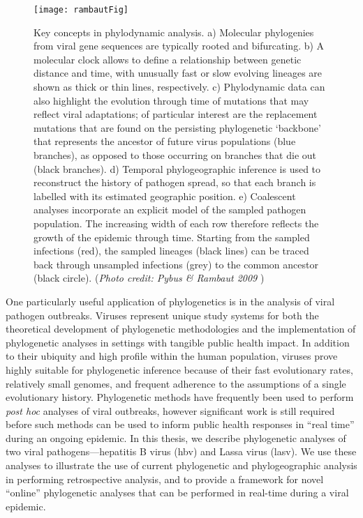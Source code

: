 \begin{figure}[ht]
  \centering
  \medskip
  \texttt{[image: rambautFig]}
  \caption[Applications of phylogenetic analysis]{Key concepts in phylodynamic analysis.
  a) Molecular phylogenies from viral gene sequences are typically rooted and bifurcating.
  b) A molecular clock allows to define a relationship between genetic distance and time, with unusually fast or slow evolving lineages are shown as thick or thin lines, respectively.
  c) Phylodynamic data can also highlight the evolution through time of mutations that may reflect viral adaptations; of particular interest are the replacement mutations that are found on the persisting phylogenetic ‘backbone’ that represents the ancestor of future virus populations (blue branches), as opposed to those occurring on branches that die out (black branches).
  d) Temporal phylogeographic inference is used to reconstruct the history of pathogen spread, so that each branch is labelled with its estimated geographic position.
  e) Coalescent analyses incorporate an explicit model of the sampled pathogen population.
  The increasing width of each row therefore reflects the growth of the epidemic through time. Starting from the sampled infections (red), the sampled lineages (black lines) can be traced back through unsampled infections (grey) to the common ancestor (black circle).
  (\textit{Photo credit: Pybus \& Rambaut 2009} \cite{pybus2009evolutionary})
  }
  \label{fig:phylogeneticsOverview}
\end{figure}


One particularly useful application of phylogenetics is in the analysis of viral pathogen outbreaks.
Viruses represent unique study systems for both the theoretical development of phylogenetic methodologies and the implementation of phylogenetic analyses in settings with tangible public health impact.
In addition to their ubiquity and high profile within the human population, viruses prove highly suitable for phylogenetic inference because of their fast evolutionary rates, relatively small genomes, and frequent adherence to the assumptions of a single evolutionary history.
Phylogenetic methods have frequently been used to perform \textit{post hoc} analyses of viral outbreaks, however significant work is still required before such methods can be used to inform public health responses in ``real time'' during an ongoing epidemic.
In this thesis, we describe phylogenetic analyses of two viral pathogens---hepatitis B virus (\gls{hbv}) and Lassa virus (\gls{lasv}).
We use these analyses to illustrate the use of current phylogenetic and phylogeographic analysis in performing retrospective analysis, and to provide a framework for novel ``online'' phylogenetic analyses that can be performed in real-time during a viral epidemic.

